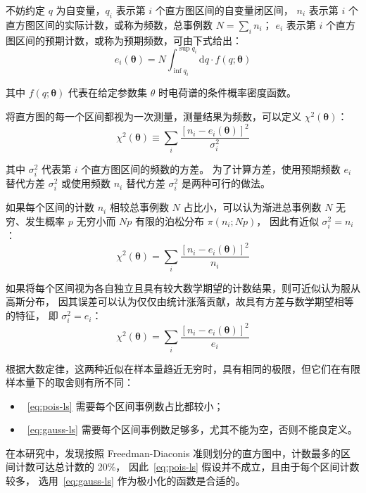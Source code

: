 不妨约定 $q$ 为自变量，$q_i$ 表示第 $i$ 个直方图区间的自变量闭区间，
$n_i$ 表示第 $i$ 个直方图区间的实际计数，或称为频数，总事例数 $N=\sum_{i}n_i$；
$e_i$ 表示第 $i$ 个直方图区间的预期计数，或称为预期频数，可由下式给出：
\begin{equation}
    e_i(\boldsymbol{\theta}) = N\int_{\inf q_i}^{\sup q_i}\mathrm{d}q\cdot f(q;\boldsymbol{\theta})
\end{equation}

其中 $f(q;\boldsymbol{\theta})$ 代表在给定参数集 $\theta$ 时电荷谱的条件概率密度函数。

将直方图的每一个区间都视为一次测量，测量结果为频数，可以定义 $\chi^2(\boldsymbol{\theta})$：
\begin{equation}
    \chi^2(\boldsymbol{\theta})\equiv\sum_{i}\frac{\left[n_i-e_i(\boldsymbol{\theta})\right]^2}{\sigma_i^2}
\end{equation}

其中 $\sigma_i^2$ 代表第 $i$ 个直方图区间的频数的方差。
为了计算方差，使用预期频数 $e_i$ 替代方差 $\sigma_i^2$ 或使用频数 $n_i$ 替代方差 $\sigma_i^2$ 是两种可行的做法。

如果每个区间的计数 $n_i$ 相较总事例数 $N$ 占比小，可以认为渐进总事例数 $N$ 无穷、发生概率 $p$ 无穷小而 $Np$ 有限的泊松分布 $\pi(n_i;Np)$，
因此有近似 $\sigma^2_i=n_i$：
\begin{equation}
    \chi^2(\boldsymbol{\theta})=\sum_{i}\frac{\left[n_i-e_i(\boldsymbol{\theta})\right]^2}{n_i}
    \label{eq:pois-ls}
\end{equation}

如果将每个区间视为各自独立且具有较大数学期望的计数结果，则可近似认为服从高斯分布，
因其误差可以认为仅仅由统计涨落贡献，故具有方差与数学期望相等的特征，
即 $\sigma^2_i=e_i$：
\begin{equation}
    \chi^2(\boldsymbol{\theta})=\sum_{i}\frac{\left[n_i-e_i(\boldsymbol{\theta})\right]^2}{e_i}
    \label{eq:gauss-ls}
\end{equation}

根据大数定律，这两种近似在样本量趋近无穷时，具有相同的极限，但它们在有限样本量下的取舍则有所不同：
\begin{itemize}
    \item~\eqref{eq:pois-ls} 需要每个区间事例数占比都较小；
    \item~\eqref{eq:gauss-ls} 需要每个区间事例数足够多，尤其不能为空，否则不能良定义。
\end{itemize}

在本研究中，发现按照 Freedman-Diaconis 准则划分的直方图中，计数最多的区间计数可达总计数的 20\%，
因此~\eqref{eq:pois-ls} 假设并不成立，且由于每个区间计数较多，
选用~\eqref{eq:gauss-ls} 作为极小化的函数是合适的。


